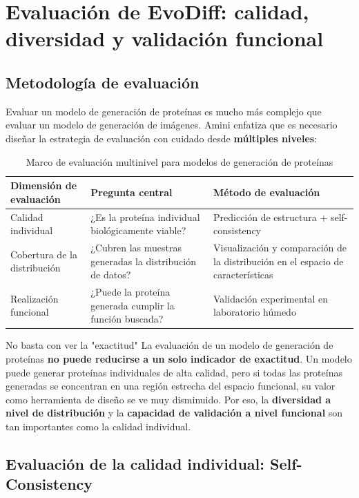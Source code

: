 \section{Evaluación de EvoDiff: calidad, diversidad y validación funcional}

\subsection{Metodología de evaluación}

Evaluar un modelo de generación de proteínas es mucho más complejo que evaluar un modelo de generación de imágenes. Amini enfatiza que es necesario diseñar la estrategia de evaluación con cuidado desde \textbf{múltiples niveles}:

\begin{table}[H]
\centering
\caption{Marco de evaluación multinivel para modelos de generación de proteínas}
\begin{tabular}{@{}lll@{}}
\toprule
\textbf{Dimensión de evaluación} & \textbf{Pregunta central} & \textbf{Método de evaluación} \\
\midrule
Calidad individual & ¿Es la proteína individual biológicamente viable? & Predicción de estructura + self-consistency \\
Cobertura de la distribución & ¿Cubren las muestras generadas la distribución de datos? & Visualización y comparación de la distribución en el espacio de características \\
Realización funcional & ¿Puede la proteína generada cumplir la función buscada? & Validación experimental en laboratorio húmedo \\
\bottomrule
\end{tabular}
\end{table}

\begin{warningbox}{No basta con ver la "exactitud"}
La evaluación de un modelo de generación de proteínas \textbf{no puede reducirse a un solo indicador de exactitud}. Un modelo puede generar proteínas individuales de alta calidad, pero si todas las proteínas generadas se concentran en una región estrecha del espacio funcional, su valor como herramienta de diseño se ve muy disminuido. Por eso, la \textbf{diversidad a nivel de distribución} y la \textbf{capacidad de validación a nivel funcional} son tan importantes como la calidad individual.
\end{warningbox}

\subsection{Evaluación de la calidad individual: Self-Consistency}

